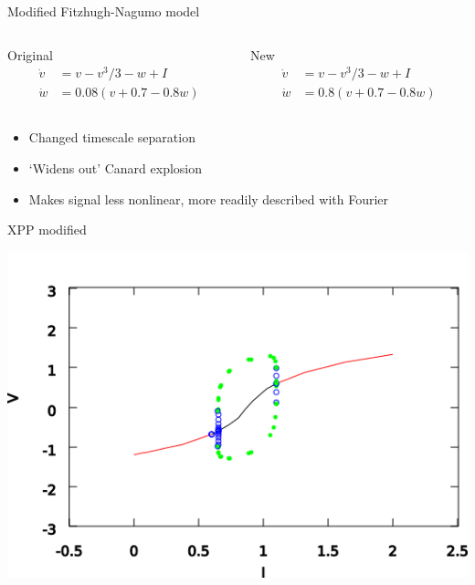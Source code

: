 \documentclass[presentation]{beamer}
\begin{document}
\begin{frame}[label={sec:orga12818d}]{Modified Fitzhugh-Nagumo model}
\begin{columns}
\begin{column}{0.5\columnwidth}
\begin{block}{Original}
\begin{align}
\dot{v} &= v - v^3/3 - w + I\\
\dot{w} &= 0.08(v + 0.7 - 0.8w)
\end{align}
\end{block}
\end{column}

\begin{column}{0.5\columnwidth}
\begin{block}{New}
\begin{align}
\dot{v} &= v - v^3/3 - w + I\\
\dot{w} &= 0.8(v + 0.7 - 0.8w)
\end{align}
\end{block}
\end{column}
\end{columns}

\vfill

\begin{itemize}
\item Changed timescale separation
\item `Widens out' Canard explosion
\item Makes signal less nonlinear, more readily described with Fourier
\end{itemize}
\end{frame}

\begin{frame}[plain,label={sec:org2900f7b}]{XPP modified}
\begin{center}
\includegraphics[width=.9\linewidth]{./modified_FH_bifurcation.png}
\end{center}
\end{frame}
\end{document}
